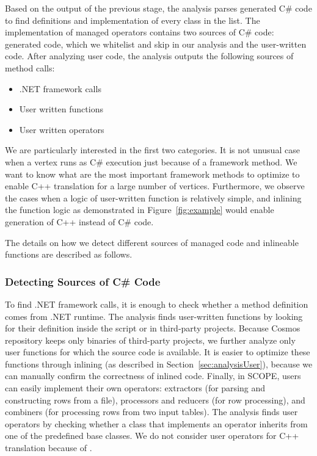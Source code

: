 Based on the output of the previous stage, the analysis parses generated C\# code to find definitions and implementation of every class in the list. The implementation of managed operators contains two sources of C\# code: generated code, which we whitelist and skip in our analysis and the user-written code. After analyzing user code, the analysis outputs the following sources of method calls:
\begin{itemize}
\item .NET framework calls
\item User written functions
\item User written operators 
\end{itemize}

We are particularly interested in the first two categories. It is not unusual case when a vertex runs as C\# execution just because of a framework method. We want to know what are the most important framework methods to optimize to enable C++ translation for a large number of vertices. Furthermore, we observe the cases when a logic of user-written function is relatively simple, and inlining the function logic as demonstrated in Figure~\ref{fig:example} would enable generation of C++ instead of C\# code. 

The details on how we detect different sources of managed code and inlineable functions are described as follows.

\subsubsection{Detecting Sources of C\# Code}
To find .NET framework calls, it is enough to check whether a method definition comes from .NET runtime. The analysis finds user-written functions by looking for their definition inside the script or in third-party projects. Because Cosmos repository keeps only binaries of third-party projects, we further analyze only user functions for which the source code is available. It is easier to optimize these functions through inlining (as described in Section~\ref{sec:analysisUser}), because we can manually confirm the correctness of inlined code. Finally, in SCOPE, users can easily implement their own operators: extractors (for parsing and constructing rows from a file), processors and reducers (for row processing), and combiners (for processing rows from two input tables). The analysis finds user operators by checking whether a class that implements an operator inherits from one of the predefined base classes. We do not consider user operators for C++ translation because of .



